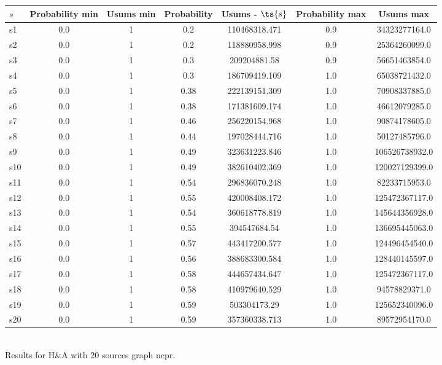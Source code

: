 \documentclass{article}
\begin{document}
\noindent\begin{tabular}{|l|c|c|c|c|c|c|}
\hline
$s$& Probability min & Usums min & Probability & Usums - $\ts{s}$ & Probability max & Usums max\\
\hline
s1 &0.0 & 1 & 0.2 & 110468318.471 & 0.9 & 34323277164.0\\
\hline
s2 &0.0 & 1 & 0.2 & 118880958.998 & 0.9 & 25364260099.0\\
\hline
s3 &0.0 & 1 & 0.3 & 209204881.58 & 0.9 & 56651463854.0\\
\hline
s4 &0.0 & 1 & 0.3 & 186709419.109 & 1.0 & 65038721432.0\\
\hline
s5 &0.0 & 1 & 0.38 & 222139151.309 & 1.0 & 70908337885.0\\
\hline
s6 &0.0 & 1 & 0.38 & 171381609.174 & 1.0 & 46612079285.0\\
\hline
s7 &0.0 & 1 & 0.46 & 256220154.968 & 1.0 & 90874178605.0\\
\hline
s8 &0.0 & 1 & 0.44 & 197028444.716 & 1.0 & 50127485796.0\\
\hline
s9 &0.0 & 1 & 0.49 & 323631223.846 & 1.0 & 106526738932.0\\
\hline
s10 &0.0 & 1 & 0.49 & 382610402.369 & 1.0 & 120027129399.0\\
\hline
s11 &0.0 & 1 & 0.54 & 296836070.248 & 1.0 & 82233715953.0\\
\hline
s12 &0.0 & 1 & 0.55 & 420008408.172 & 1.0 & 125472367117.0\\
\hline
s13 &0.0 & 1 & 0.54 & 360618778.819 & 1.0 & 145644356928.0\\
\hline
s14 &0.0 & 1 & 0.55 & 394547684.54 & 1.0 & 136695445063.0\\
\hline
s15 &0.0 & 1 & 0.57 & 443417200.577 & 1.0 & 124496454540.0\\
\hline
s16 &0.0 & 1 & 0.56 & 388683300.584 & 1.0 & 128440145597.0\\
\hline
s17 &0.0 & 1 & 0.58 & 444657434.647 & 1.0 & 125472367117.0\\
\hline
s18 &0.0 & 1 & 0.58 & 410979640.529 & 1.0 & 94578829371.0\\
\hline
s19 &0.0 & 1 & 0.59 & 503304173.29 & 1.0 & 125652340096.0\\
\hline
s20 &0.0 & 1 & 0.59 & 357360338.713 & 1.0 & 89572954170.0\\
\hline
\end{tabular}\\

\noindent Results for H\&A with 20 sources graph ncpr.
\end{document}
